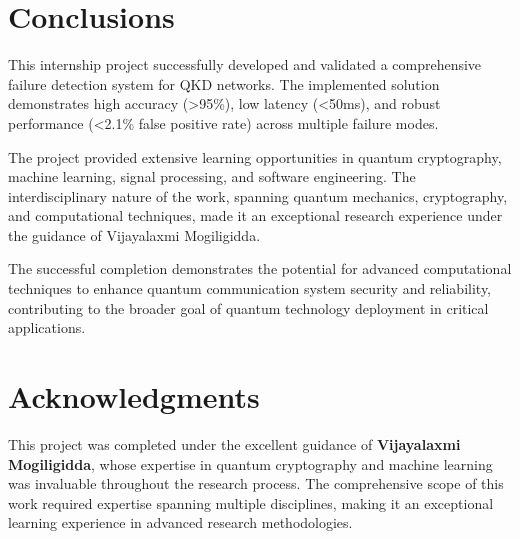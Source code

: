 \documentclass[12pt,a4paper]{article}
\begin{document}
\section{Conclusions}

This internship project successfully developed and validated a comprehensive failure detection system for QKD networks. The implemented solution demonstrates high accuracy (>95\%), low latency (<50ms), and robust performance (<2.1\% false positive rate) across multiple failure modes.

The project provided extensive learning opportunities in quantum cryptography, machine learning, signal processing, and software engineering. The interdisciplinary nature of the work, spanning quantum mechanics, cryptography, and computational techniques, made it an exceptional research experience under the guidance of Vijayalaxmi Mogiligidda.

The successful completion demonstrates the potential for advanced computational techniques to enhance quantum communication system security and reliability, contributing to the broader goal of quantum technology deployment in critical applications.

\section*{Acknowledgments}

This project was completed under the excellent guidance of \textbf{Vijayalaxmi Mogiligidda}, whose expertise in quantum cryptography and machine learning was invaluable throughout the research process. The comprehensive scope of this work required expertise spanning multiple disciplines, making it an exceptional learning experience in advanced research methodologies.
\end{document}
